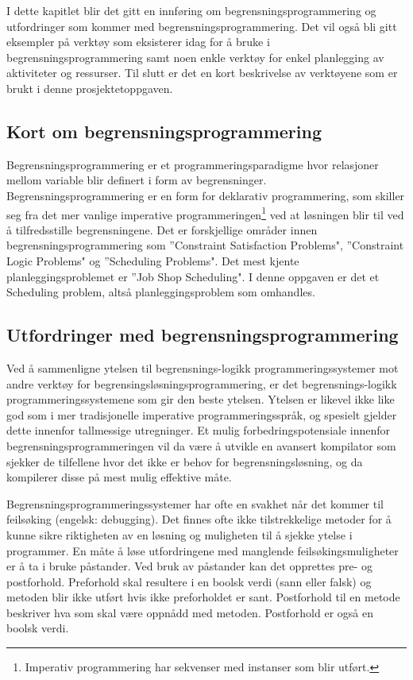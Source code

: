 I dette kapitlet blir det gitt en innføring om begrensningsprogrammering og utfordringer som kommer med begrensningsprogrammering. Det vil også bli gitt eksempler på verktøy som eksisterer idag for å bruke i begrensningsprogrammering samt noen enkle verktøy for enkel planlegging av aktiviteter og ressurser. Til slutt er det en kort beskrivelse av verktøyene som er brukt i denne prosjektetoppgaven.

\subsection{Kort om begrensningsprogrammering}
Begrensningsprogrammering er et programmeringsparadigme hvor relasjoner mellom variable blir definert i form av begrensninger. Begrensningsprogrammering er en form for deklarativ programmering, som skiller seg fra det mer vanlige imperative programmeringen\footnote{Imperativ programmering har sekvenser med instanser som blir utført.} ved at løsningen blir til ved å tilfredsstille begrensningene. Det er forskjellige områder innen begrensningsprogrammering som ''Constraint Satisfaction Problems", ''Constraint Logic Problems" og ''Scheduling Problems"\cite{cpwikipedia}. Det mest kjente planleggingsproblemet er ''Job Shop Scheduling". I denne oppgaven er det et Scheduling problem, altså planleggingsproblem som omhandles.

\subsection{Utfordringer med begrensningsprogrammering}
Ved å sammenligne ytelsen til begrensnings-logikk programmeringssystemer mot andre verktøy for begrensingsløsningsprogrammering, er det begrensnings-logikk programmeringssystemene som gir den beste ytelsen. Ytelsen er likevel ikke like god som i mer tradisjonelle imperative programmeringsspråk, og spesielt gjelder dette innenfor tallmessige utregninger. Et mulig forbedringspotensiale innenfor begrensningsprogrammeringen vil da være å utvikle en avansert kompilator som sjekker de tilfellene hvor det ikke er behov for begrensningsløsning, og da kompilerer disse på mest mulig effektive måte\cite{challengesManuel}.

Begrensningsprogrammeringssystemer har ofte en svakhet når det kommer til feilsøking (engelsk: debugging). Det finnes ofte ikke tilstrekkelige metoder for å kunne sikre riktigheten av en løsning og muligheten til å sjekke ytelse i programmer. En måte å løse utfordringene med manglende feilsøkingsmuligheter er å ta i bruke påstander. Ved bruk av påstander kan det opprettes pre- og postforhold. Preforhold skal resultere i en boolsk verdi (sann eller falsk) og metoden blir ikke utført hvis ikke preforholdet er sant. Postforhold til en metode beskriver hva som skal være oppnådd med metoden. Postforhold er også en boolsk verdi\cite{challengesManuel}.

